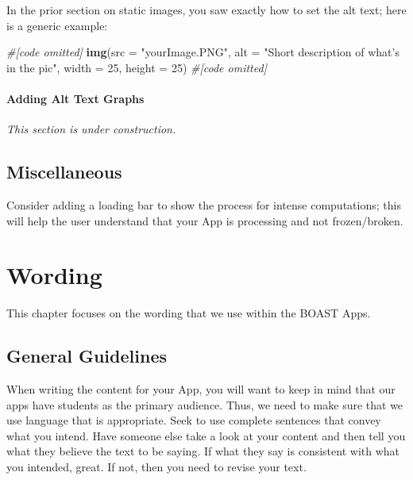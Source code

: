 \documentclass[
]{book}
\newenvironment{Shaded}{\begin{snugshade}}{\end{snugshade}}
\newcommand{\CommentTok}[1]{\textcolor[rgb]{0.56,0.35,0.01}{\textit{#1}}}
\newcommand{\DataTypeTok}[1]{\textcolor[rgb]{0.13,0.29,0.53}{#1}}
\newcommand{\DecValTok}[1]{\textcolor[rgb]{0.00,0.00,0.81}{#1}}
\newcommand{\KeywordTok}[1]{\textcolor[rgb]{0.13,0.29,0.53}{\textbf{#1}}}
\newcommand{\NormalTok}[1]{#1}
\newcommand{\StringTok}[1]{\textcolor[rgb]{0.31,0.60,0.02}{#1}}
\begin{document}
In the prior section on static images, you saw exactly how to set the alt text; here is a generic example:

\begin{Shaded}
\begin{Highlighting}[]
\CommentTok{#[code omitted]}
\KeywordTok{img}\NormalTok{(}\DataTypeTok{src =} \StringTok{"yourImage.PNG"}\NormalTok{,}
    \DataTypeTok{alt =} \StringTok{"Short description of what's in the pic"}\NormalTok{,}
    \DataTypeTok{width =} \DecValTok{25}\NormalTok{, }\DataTypeTok{height =} \DecValTok{25}\NormalTok{)}
\CommentTok{#[code omitted]}
\end{Highlighting}
\end{Shaded}

\hypertarget{adding-alt-text-graphs}{%
\subsubsection{Adding Alt Text Graphs}\label{adding-alt-text-graphs}}

\emph{This section is under construction.}

\hypertarget{miscellaneous}{%
\section{Miscellaneous}\label{miscellaneous}}

Consider adding a loading bar to show the process for intense computations; this will help the user understand that your App is processing and not frozen/broken.

\hypertarget{wording}{%
\chapter{Wording}\label{wording}}

This chapter focuses on the wording that we use within the BOAST Apps.

\hypertarget{general-guidelines}{%
\section{General Guidelines}\label{general-guidelines}}

When writing the content for your App, you will want to keep in mind that our apps have students as the primary audience. Thus, we need to make sure that we use language that is appropriate. Seek to use complete sentences that convey what you intend. Have someone else take a look at your content and then tell you what they believe the text to be saying. If what they say is consistent with what you intended, great. If not, then you need to revise your text.
\end{document}
